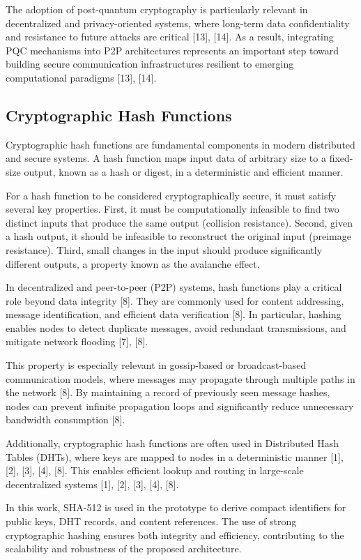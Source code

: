 \documentclass[12pt,a4paper]{article}
\begin{document}
The adoption of post-quantum cryptography is particularly relevant in decentralized and privacy-oriented systems, where long-term data confidentiality and resistance to future attacks are critical [13], [14]. As a result, integrating PQC mechanisms into P2P architectures represents an important step toward building secure communication infrastructures resilient to emerging computational paradigms [13], [14].


\subsection{Cryptographic Hash Functions}

Cryptographic hash functions are fundamental components in modern distributed and secure systems. A hash function maps input data of arbitrary size to a fixed-size output, known as a hash or digest, in a deterministic and efficient manner.

For a hash function to be considered cryptographically secure, it must satisfy several key properties. First, it must be computationally infeasible to find two distinct inputs that produce the same output (collision resistance). Second, given a hash output, it should be infeasible to reconstruct the original input (preimage resistance). Third, small changes in the input should produce significantly different outputs, a property known as the avalanche effect.

In decentralized and peer-to-peer (P2P) systems, hash functions play a critical role beyond data integrity [8]. They are commonly used for content addressing, message identification, and efficient data verification [8]. In particular, hashing enables nodes to detect duplicate messages, avoid redundant transmissions, and mitigate network flooding [7], [8].

This property is especially relevant in gossip-based or broadcast-based communication models, where messages may propagate through multiple paths in the network [8]. By maintaining a record of previously seen message hashes, nodes can prevent infinite propagation loops and significantly reduce unnecessary bandwidth consumption [8].

Additionally, cryptographic hash functions are often used in Distributed Hash Tables (DHTs), where keys are mapped to nodes in a deterministic manner [1], [2], [3], [4], [8]. This enables efficient lookup and routing in large-scale decentralized systems [1], [2], [3], [4], [8].

In this work, SHA-512 is used in the prototype to derive compact identifiers for public keys, DHT records, and content references. The use of strong cryptographic hashing ensures both integrity and efficiency, contributing to the scalability and robustness of the proposed architecture.
\end{document}
